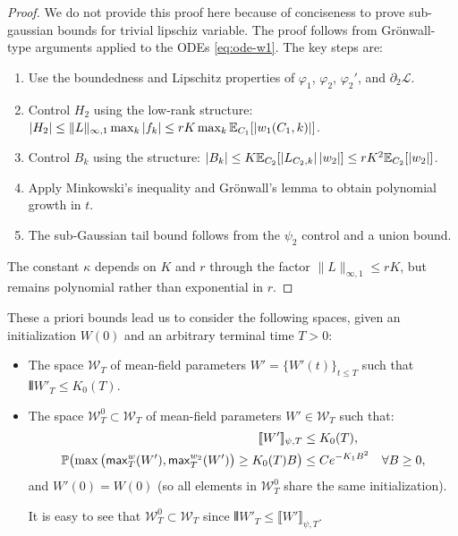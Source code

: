 \documentclass[nohyperref]{article}
\theoremstyle{plain}
\theoremstyle{definition}
\theoremstyle{remark}
\begin{document}
\begin{proof}
We do not provide this proof here because of conciseness to prove sub-gaussian bounds for trivial lipschiz variable. The proof follows from Grönwall-type arguments applied to the ODEs \eqref{eq:ode-w1}. The key steps are:
\begin{enumerate}
\item Use the boundedness and Lipschitz properties of $\varphi_1$, $\varphi_2$, $\varphi_2'$, and $\partial_2\mathcal{L}$.
\item Control $H_2$ using the low-rank structure: $|H_2|\le \|L\|_{\infty,1}\max_k|f_k|\le rK\max_k\mathbb{E}_{C_1}[|w_1(C_1,k)|]$.
\item Control $B_k$ using the structure: $|B_k|\le K\mathbb{E}_{C_2}[|L_{C_2,k}|\,|w_2|]\le rK^2\mathbb{E}_{C_2}[|w_2|]$.
\item Apply Minkowski's inequality and Grönwall's lemma to obtain polynomial growth in $t$.
\item The sub-Gaussian tail bound follows from the $\psi_2$ control and a union bound.
\end{enumerate}
The constant $\kappa$ depends on $K$ and $r$ through the factor $\|L\|_{\infty,1}\le rK$, but remains polynomial rather than exponential in $r$.
\end{proof}

These a priori bounds lead us to consider the following spaces, given an initialization $W(0)$ and an arbitrary terminal time $T>0$:

\begin{itemize}
\item The space $\mathcal{W}_T$ of mean-field parameters $W'=\{W'(t)\}_{t\le T}$ such that ${\interleave{W'}}_T \le K_0(T)$.

\item The space $\mathcal{W}_T^0\subset\mathcal{W}_T$ of mean-field parameters $W'\in\mathcal{W}_T$ such that:
\begin{align*}
[\![ W']\!]_{\psi,T} &\le K_0(T),\\
\mathbb{P}\!\left(\max\big(\mathsf{max}_T^w(W'), \mathsf{max}_T^{w_2}(W')\big)\ge K_0(T)B\right) &\le C e^{-K_1 B^2} \quad \forall B\ge 0,
\end{align*}
and $W'(0)=W(0)$ (so all elements in $\mathcal{W}_T^0$ share the same initialization).

It is easy to see that $\mathcal{W}_T^0\subset\mathcal{W}_T$ since ${\interleave{W'}}_T \le \llbracket W'\rrbracket_{\psi,T}$.
\end{itemize}
\end{document}
